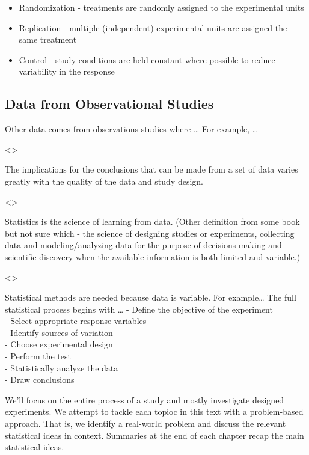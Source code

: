 \documentclass[]{book}
\providecommand{\tightlist}{%
  \setlength{\itemsep}{0pt}\setlength{\parskip}{0pt}}
\begin{document}
\begin{itemize}
\tightlist
\item
  Randomization - treatments are randomly assigned to the experimental
  units\\
\item
  Replication - multiple (independent) experimental units are assigned
  the same treatment\\
\item
  Control - study conditions are held constant where possible to reduce
  variability in the response
\end{itemize}

\subsection{Data from Observational
Studies}\label{data-from-observational-studies}

Other data comes from observations studies where \ldots{} For example,
\ldots{}

\textless{}\textgreater{}

The implications for the conclusions that can be made from a set of data
varies greatly with the quality of the data and study design.

\textless{}\textgreater{}

Statistics is the science of learning from data. (Other definition from
some book but not sure which - the science of designing studies or
experiments, collecting data and modeling/analyzing data for the purpose
of decisions making and scientific discovery when the available
information is both limited and variable.)

\textless{}\textgreater{}

Statistical methods are needed because data is variable. For
example\ldots{} The full statistical process begins with \ldots{} -
Define the objective of the experiment\\
- Select appropriate response variables\\
- Identify sources of variation\\
- Choose experimental design\\
- Perform the test\\
- Statistically analyze the data\\
- Draw conclusions

We'll focus on the entire process of a study and mostly investigate
designed experiments. We attempt to tackle each topioc in this text with
a problem-based approach. That is, we identify a real-world problem and
discuss the relevant statistical ideas in context. Summaries at the end
of each chapter recap the main statistical ideas.
\end{document}
